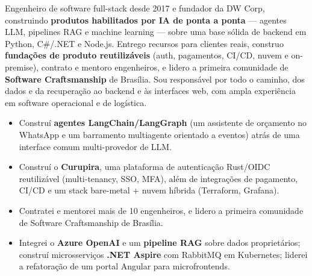 \documentclass[10pt,a4paper]{altacv}
\begin{document}

\makecvheader


Engenheiro de software full-stack desde 2017 e fundador da DW Corp, construindo \textbf{produtos habilitados por IA de ponta a ponta} — agentes LLM, pipelines RAG e machine learning — sobre uma base sólida de backend em Python, C\#/.NET e Node.js. Entrego recursos para clientes reais, construo \textbf{fundações de produto reutilizáveis} (auth, pagamentos, CI/CD, nuvem e on-premise), contrato e mentoro engenheiros, e lidero a primeira comunidade de \textbf{Software Craftsmanship} de Brasília. Sou responsável por todo o caminho, dos dados e da recuperação ao backend e às interfaces web, com ampla experiência em software operacional e de logística.


\begin{itemize}
\item Construí \textbf{agentes LangChain/LangGraph} (um assistente de orçamento no WhatsApp e um barramento multiagente orientado a eventos) atrás de uma interface comum multi-provedor de LLM.
\item Construí o \textbf{Curupira}, uma plataforma de autenticação Rust/OIDC reutilizável (multi-tenancy, SSO, MFA), além de integrações de pagamento, CI/CD e um stack bare-metal + nuvem híbrida (Terraform, Grafana).
\item Contratei e mentorei mais de 10 engenheiros, e lidero a primeira comunidade de Software Craftsmanship de Brasília.
\end{itemize}
\divider

\begin{itemize}
\item Integrei o \textbf{Azure OpenAI} e um \textbf{pipeline RAG} sobre dados proprietários; construí microsserviços \textbf{.NET Aspire} com RabbitMQ em Kubernetes; liderei a refatoração de um portal Angular para microfrontends.
\end{itemize}
\divider
\end{document}
